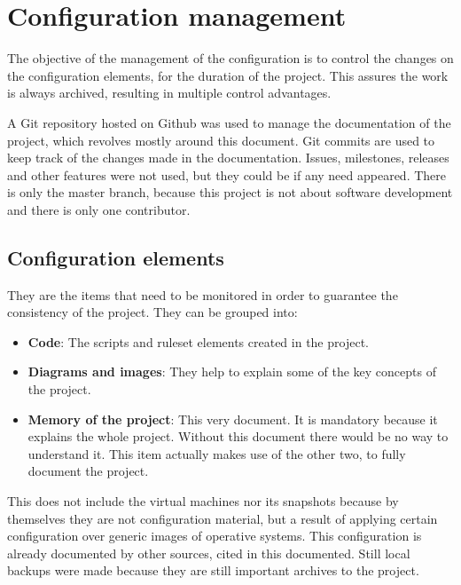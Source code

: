 \section{Configuration management}
The objective of the management of the configuration is to control the changes on the configuration elements, for the duration of the project. This assures the work is always archived, resulting in multiple control advantages.

\linej
\linej
A Git repository\cite{memoria_github} hosted on Github was used to manage the documentation of the project, which revolves mostly around this document.
\linej
Git commits are used to keep track of the changes made in the documentation.
Issues, milestones, releases and other features were not used, but they could be if any need appeared.
There is only the master branch, because this project is not about software development and there is only one contributor.

\subsection{Configuration elements}
They are the items that need to be monitored in order to guarantee the consistency of the project.
They can be grouped into:
\begin{itemize}
	\item \textbf{Code}: The scripts and ruleset elements created in the project.
	\item \textbf{Diagrams and images}: They help to explain some of the key concepts of the project.
	\item \textbf{Memory of the project}: This very document. It is mandatory because it explains the whole project. Without this document there would be no way to understand it. This item actually makes use of the other two, to fully document the project.
\end{itemize}

This does not include the virtual machines nor its snapshots because by themselves they are not configuration material, but a result of applying certain configuration over generic images of operative systems. This configuration is already documented by other sources, cited in this documented. Still local backups were made because they are still important archives to the project.
